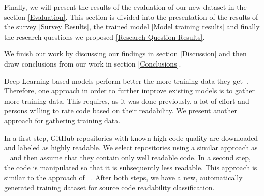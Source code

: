 \documentclass[%
class=scrreprt,
chapterprefix=false,%
open=right,%
twoside=false,%
paper=a4,%
logofile={Logo\_zentral\_farbig\_EN.png},%
thesistype=master,%
UKenglish,%
]{se2thesis}
\theoremstyle{definition}
\begin{document}
	Finally, we will present the results of the evaluation of our new dataset in the section \ref{Evaluation}. This section is divided into the presentation of the results of the survey \ref{Survey Results}, the trained model \ref{Model training results} and finally the research questions we proposed \ref{Research Question Results}.
	
	We finish our work by discussing our findings in section \ref{Discussion} and then draw conclusions from our work in section \ref{Conclusions}.
		

	Deep Learning based models perform better the more training data they get~\cite{hestness2017deep}. Therefore, one approach in order to further improve existing models is to gather more training data.
	This requires, as it was done previously, a lot of effort and persons willing to rate code based on their readability. We present another approach for gathering training data.
	
	In a first step, GitHub repositories with known high code quality are downloaded and labeled as highly readable. We select repositories using a similar approach as \citeauthor{allamanis2016convolutional}~\cite{allamanis2016convolutional} and then assume that they contain only well readable code.
	In a second step, the code is manipulated so that it is subsequently less readable. This approach is similar to the approach of \citeauthor{loriot2022styler}~\cite{loriot2022styler}. After both steps, we have a new, automatically generated training dataset for source code readability classification.
	
\end{document}

